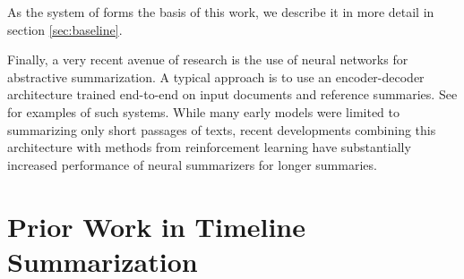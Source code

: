 \documentclass[a4paper,BCOR=10mm]{report}
\numberwithin{lemma}{chapter}
\numberwithin{definition}{chapter}
\begin{document}
As the system of \citet{banerjee} forms the basis of this work, we describe it in more detail in section \ref{sec:baseline}.



%


Finally, a very recent avenue of research is the use of neural networks for abstractive summarization. A typical approach is to use an encoder-decoder architecture trained end-to-end on input documents and reference summaries. See \citet{nallapati, rush} for examples of such systems.
While many early models were limited to summarizing only short passages of texts, recent developments combining this architecture with methods from reinforcement learning have substantially increased performance of neural summarizers for longer summaries. \citep{paulus}



\section{Prior Work in Timeline Summarization} \label{sec:prior-work-tl} 
\end{document}
